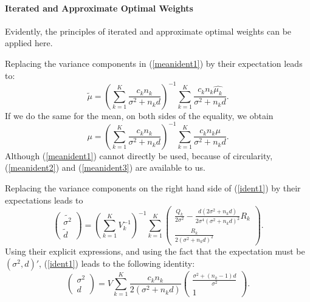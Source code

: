 \documentclass[11pt,a5paper,twoside]{book}
\let\oldparagraph\paragraph
\renewcommand{\paragraph}[1]{\oldparagraph{#1}\mbox{}}
\begin{document}
\paragraph{Iterated and Approximate Optimal Weights}\label{iaow}

Evidently, the principles of iterated and approximate optimal weights 
can be applied here.

Replacing the variance components in (\ref{meanident1}) by their 
expectation leads to:
\begin{equation}
\label{meanident2}
\widetilde{\mu}=\left(\sum_{k=1}^K\frac{c_kn_k}{\sigma^2+n_kd}\right)^{-1}
\sum_{k=1}^K\frac{c_kn_k\widehat{\mu_k}}{\sigma^2+n_kd}.
\end{equation}
If we do the same for the mean, on both sides of the equality, we obtain
\begin{equation}
\label{meanident3}
\mu=\left(\sum_{k=1}^K\frac{c_kn_k}{\sigma^2+n_kd}\right)^{-1}
\sum_{k=1}^K\frac{c_kn_k\mu}{\sigma^2+n_kd}.
\end{equation}
Although (\ref{meanident1}) cannot directly be used, because of  
circularity, (\ref{meanident2}) and (\ref{meanident3}) are available to us.

Replacing the variance components on the right hand side of (\ref{ident1}) 
by their expectations leads to
\begin{equation}
\label{ident2}
\left(
\begin{array}{c}
\widetilde{\sigma^2}\\
\widetilde{d}
\end{array}
\right)
=
\left(\sum_{k=1}^KV_k^{-1}\right)^{-1}
\sum_{k=1}^K
\left(
\begin{array}{c}
\frac{Q_k}{2\sigma^2}-\frac{d(2\sigma^2+n_kd)}{2\sigma^4(\sigma^2+n_kd)^2}R_k\\
\frac{R_k}{2(\sigma^2+n_kd)^2}
\end{array}
\right)
.
\end{equation}
Using their explicit expressions, and using the fact 
that the expectation must be $(\sigma^2,d)'$, (\ref{ident1}) 
leads to the following identity:
\begin{equation}
\label{ident3}
\left(
\begin{array}{c}
\sigma^2\\ d
\end{array}
\right)
=
V\sum_{k=1}^K\frac{c_kn_k}{2(\sigma^2+n_kd)}
\left(
\begin{array}{c}
\frac{\sigma^2+(n_k-1)d}{\sigma^2}\\
1
\end{array}
\right)
.
\end{equation}
\end{document}
